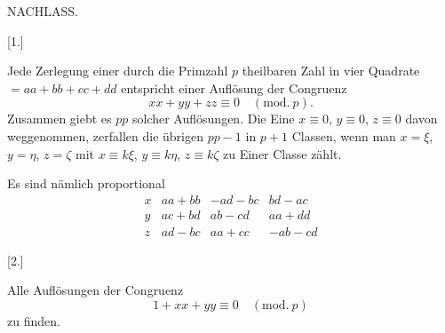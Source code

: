 \begin{center}
{\Large NACHLASS.\par}
\]
\end{center}
\begin{center}[1.]\end{center}
\noindent\hspace*{\parindent}Jede Zerlegung einer durch die Primzahl $p$ theilbaren Zahl in vier Quadrate $=aa+bb+cc+dd$ entspricht einer Auflösung der Congruenz
\[
xx+yy+zz\equiv 0\quad(\mathrm{mod.}\ p).
\]
\noindent Zusammen giebt es $pp$ solcher Auflösungen. Die Eine $x\equiv0$, $y\equiv0$, $z\equiv0$ davon weggenommen, zerfallen die übrigen $pp-1$ in $p+1$ Classen, wenn man $x=\xi$, $y=\eta$, $z=\zeta$ mit $x\equiv k\xi$, $y\equiv k\eta$, $z\equiv k\zeta$ zu Einer Classe zählt.

Es sind nämlich proportional
\[
\begin{array}{c|c|c|c}
x & aa+bb & -ad-bc & bd-ac\\
y & ac+bd & ab-cd & aa+dd\\
z & ad-bc & aa+cc & -ab-cd
\end{array}
\]
\begin{center}[2.]\end{center}
\noindent\hspace*{\parindent}Alle Auflösungen der Congruenz
\[
1+xx+yy\equiv0\quad(\mathrm{mod.}\ p)
\]
\noindent zu finden.
\clearpage
